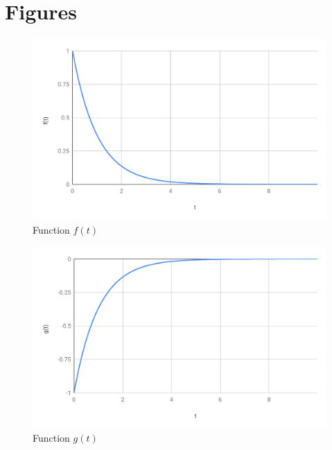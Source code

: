 \section{Figures}
\begin{figure}[ht]
    \centering
    \includegraphics[scale=0.74]{image/05-RC-RL/f.pdf}
    \caption{Function $f(t)$}
    \label{figure.05.f}
\end{figure}
\begin{figure}[ht]
    \centering
    \includegraphics[scale=0.74]{image/05-RC-RL/g.pdf}
    \caption{Function $g(t)$}
    \label{figure.05.g}
\end{figure}
